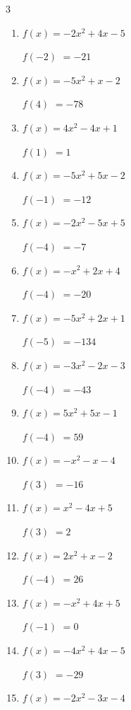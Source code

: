 \begin{multicols}{3}
\begin{enumerate}
$f(2)$
        $= 28$

\columnbreak %

  \item $f(x)=-2x^{2}+4x-5$

$f(-2)$
        $= -21$

  \item $f(x)=-5x^{2}+x-2$

$f(4)$
        $= -78$

  \item $f(x)=4x^{2}-4x+1$

$f(1)$
        $= 1$

  \item $f(x)=-5x^{2}+5x-2$

$f(-1)$
        $= -12$

  \item $f(x)=-2x^{2}-5x+5$

$f(-4)$
        $= -7$

  \item $f(x)=-x^{2}+2x+4$

$f(-4)$
        $= -20$

  \item $f(x)=-5x^{2}+2x+1$

$f(-5)$
        $= -134$

  \item $f(x)=-3x^{2}-2x-3$

$f(-4)$
        $= -43$

  \item $f(x)=5x^{2}+5x-1$

$f(-4)$
        $= 59$

  \item $f(x)=-x^{2}-x-4$

$f(3)$
        $= -16$

  \item $f(x)=x^{2}-4x+5$

$f(3)$
        $= 2$

  \item $f(x)=2x^{2}+x-2$

$f(-4)$
        $= 26$

  \item $f(x)=-x^{2}+4x+5$

$f(-1)$
        $= 0$

  \item $f(x)=-4x^{2}+4x-5$

$f(3)$
        $= -29$

  \item $f(x)=-2x^{2}-3x-4$


\end{enumerate}
\end{multicols}
